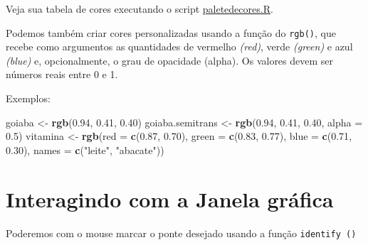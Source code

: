 \documentclass[
]{book}
\newenvironment{Shaded}{\begin{snugshade}}{\end{snugshade}}
\newcommand{\DataTypeTok}[1]{\textcolor[rgb]{0.13,0.29,0.53}{#1}}
\newcommand{\DecValTok}[1]{\textcolor[rgb]{0.00,0.00,0.81}{#1}}
\newcommand{\FloatTok}[1]{\textcolor[rgb]{0.00,0.00,0.81}{#1}}
\newcommand{\KeywordTok}[1]{\textcolor[rgb]{0.13,0.29,0.53}{\textbf{#1}}}
\newcommand{\NormalTok}[1]{#1}
\newcommand{\OperatorTok}[1]{\textcolor[rgb]{0.81,0.36,0.00}{\textbf{#1}}}
\newcommand{\StringTok}[1]{\textcolor[rgb]{0.31,0.60,0.02}{#1}}
\begin{document}
Veja sua tabela de cores executando o script \href{https://www.dropbox.com/s/e9a27z97buqjovz/paletadecores.R?dl=1}{paletedecores.R}.

Podemos também criar cores personalizadas usando a função do \texttt{rgb()}, que recebe como argumentos as quantidades de vermelho \emph{(red)}, verde \emph{(green)} e azul \emph{(blue)} e, opcionalmente, o grau de opacidade (alpha). Os valores devem ser números reais entre 0 e 1.

Exemplos:

\begin{Shaded}
\begin{Highlighting}[]
\NormalTok{goiaba <-}\StringTok{ }\KeywordTok{rgb}\NormalTok{(}\FloatTok{0.94}\NormalTok{, }\FloatTok{0.41}\NormalTok{, }\FloatTok{0.40}\NormalTok{)}
\NormalTok{goiaba.semitrans <-}\StringTok{ }\KeywordTok{rgb}\NormalTok{(}\FloatTok{0.94}\NormalTok{, }\FloatTok{0.41}\NormalTok{, }\FloatTok{0.40}\NormalTok{, }\DataTypeTok{alpha =} \FloatTok{0.5}\NormalTok{)}
\NormalTok{vitamina <-}\StringTok{ }\KeywordTok{rgb}\NormalTok{(}\DataTypeTok{red =} \KeywordTok{c}\NormalTok{(}\FloatTok{0.87}\NormalTok{, }\FloatTok{0.70}\NormalTok{), }\DataTypeTok{green =} \KeywordTok{c}\NormalTok{(}\FloatTok{0.83}\NormalTok{, }\FloatTok{0.77}\NormalTok{),}
\DataTypeTok{blue =} \KeywordTok{c}\NormalTok{(}\FloatTok{0.71}\NormalTok{, }\FloatTok{0.30}\NormalTok{), }\DataTypeTok{names =} \KeywordTok{c}\NormalTok{(}\StringTok{"leite"}\NormalTok{, }\StringTok{"abacate"}\NormalTok{))}
\end{Highlighting}
\end{Shaded}

\hypertarget{interagindo-com-a-janela-gruxe1fica}{%
\section{Interagindo com a Janela gráfica}\label{interagindo-com-a-janela-gruxe1fica}}

Poderemos com o mouse marcar o ponte desejado usando a função \texttt{identify\ ()}

\begin{Shaded}
\end{Shaded}
\end{document}
